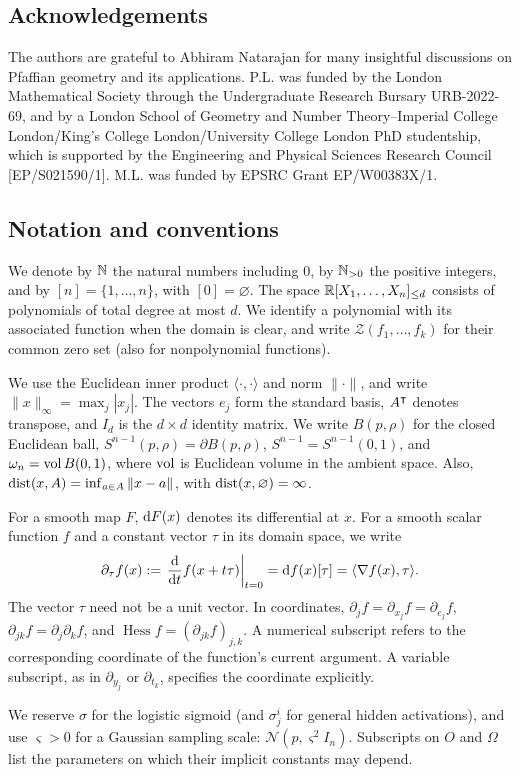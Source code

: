 \subsection{Acknowledgements} The authors are grateful to Abhiram Natarajan for many insightful discussions on Pfaffian geometry and its applications. P.L. was funded by the London Mathematical Society through the Undergraduate Research Bursary URB-2022-69, and by a London School of Geometry and Number Theory--Imperial College London/King's College London/University College London PhD studentship, which is supported by the Engineering and Physical Sciences Research Council [EP/S021590/1]. M.L. was funded by EPSRC Grant EP/W00383X/1. 

\subsection{Notation and conventions}\label{subsec:notation}
We denote by $\mathbb{N}$ the natural numbers including $0$, by $\mathbb{N}_{>0}$ the positive integers, and by $[n]=\{1,\dots,n\}$, with $[0]=\varnothing$. The space $\mathbb{R}[X_1,\dots,X_n]_{\le d}$ consists of polynomials of total degree at most $d$. We identify a polynomial with its associated function when the domain is clear, and write $\mathcal Z(f_1,\dots,f_k)$ for their common zero set (also for nonpolynomial functions).

We use the Euclidean inner product $\langle\cdot,\cdot\rangle$ and norm $\|\cdot\|$, and write $\|x\|_\infty=\max_j|x_j|$. The vectors $e_j$ form the standard basis, $A^{\intercal}$ denotes transpose, and $I_d$ is the $d\times d$ identity matrix. We write $B(p,\rho)$ for the closed Euclidean ball, $S^{n-1}(p,\rho)=\partial B(p,\rho)$, $S^{n-1}=S^{n-1}(0,1)$, and $\omega_n=\operatorname{vol} B(0,1)$, where $\operatorname{vol}$ is Euclidean volume in the ambient space. Also, $\operatorname{dist}(x,A)=\inf_{a\in A}\|x-a\|$, with $\operatorname{dist}(x,\varnothing)=\infty$.

For a smooth map $F$, $\mathrm{d}{F}(x)$ denotes its differential at $x$. For a smooth scalar function $f$ and a constant vector $\tau$ in its domain space, we write
\[
\partial_\tau f(x):=\left.\frac{\mathrm{d}{}}{\mathrm{d}{t}}f(x+t\tau)\right|_{t=0}
=\mathrm{d}{f}(x)[\tau]=\langle\nabla f(x),\tau\rangle.
\]
The vector $\tau$ need not be a unit vector. In coordinates, $\partial_j f=\partial_{x_j}f=\partial_{e_j}f$, $\partial_{jk}f=\partial_j\partial_k f$, and $\operatorname{Hess}f=(\partial_{jk}f)_{j,k}$. A numerical subscript refers to the corresponding coordinate of the function's current argument. A variable subscript, as in $\partial_{y_j}$ or $\partial_{t_k}$, specifies the coordinate explicitly.

We reserve $\sigma$ for the logistic sigmoid (and $\sigma^i_j$ for general hidden activations), and use $\varsigma>0$ for a Gaussian sampling scale: $\mathcal N(p,\varsigma^2 I_n)$. Subscripts on $O$ and $\Omega$ list the parameters on which their implicit constants may depend.
